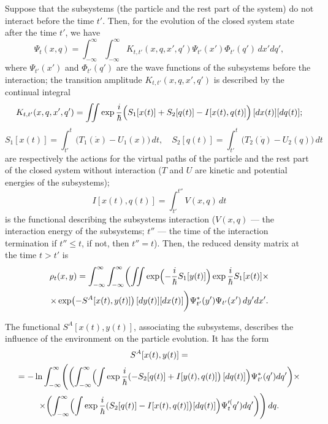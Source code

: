 Suppose that the subsystems (the particle and the rest part of the system) do not interact before the time $t'$. Then, for the evolution of the closed system state after the time $t'$, we have
\begin{equation*}
 \Psi_{t}(x,q)=\int _{-\infty}^{\infty}\int _{-\infty}^{\infty} K_{t,t'}(x,q,x',q')\Psi_{t'}(x')\Phi_{t'}(q')\,dx'dq',
\end{equation*}
where $\Psi_{t'}(x')$ and $\Phi_{t'}(q')$ are the wave functions of the subsystems before the interaction; 
the transition amplitude $K_{t,t'}(x,q,x',q')$ is described by the continual integral~\cite{bib:12}
\begin{equation*}
 K_{t,t'}(x,q,x',q')=\iint \exp\frac{i}{\hbar}\Bigl(S_1[x(t)]+S_2[q(t)]-I[x(t),q(t)]\Bigr)\,[dx(t)][dq(t)]; 
\end{equation*}
$$S_1[x(t)]=\int _{t'}^{t}\bigl(T_1(\dot{x})-U_1(x)\bigr)\,dt,\quad S_2[q(t)]=\int _{t'}^{t}\bigl(T_2(\dot{q})-U_2(q)\bigr)\,dt$$ are respectively the actions for the virtual paths of the particle and the rest part of the closed system without interaction ($T$ and $U$ are kinetic and potential energies of the subsystems); 
$$
I[x(t),q(t)]=\int _{t'}^{t''}V(x,q)\,dt
$$ is the functional describing the subsystems interaction ($V(x,q)$ --- the interaction energy of the subsystems; $t''$  --- the time of the interaction termination if $t''\leq t$, if not, then $t''=t$). Then, the reduced density matrix at the time $t>t'$ is 
\begin{multline}\label{eq:math:ex1}
 \rho_t(x,y)=\int _{-\infty}^{\infty}\int _{-\infty}^{\infty}\biggl(\iint\exp\Bigl(-\frac{i}{\hbar}S_1[y(t)]\Bigr)\exp\frac{i}{\hbar}S_1[x(t)]\times 
 \\
 \times\exp\bigl(- S^A[x(t),y(t)]\bigr)\,[dy(t)][dx(t)]\biggr)\Psi_{t'}^*(y')\Psi_{t'}(x')\,dy'dx'.
\end{multline}

The functional $S^A[x(t),y(t)]$, associating the subsystems, describes the influence of the environment on the particle evolution. It has the form
\begin{multline}\label{eq:math:ex2}
 S^A[x(t),y(t)]=\\
 =-\ln\int _{-\infty}^{\infty}\Biggl(\biggl(\int _{-\infty}^{\infty}\Bigl(\int\exp\frac{i}{\hbar}(-S_2[q(t)]+I[y(t),q(t)]\bigr)\,[dq(t)]\Bigr)\Psi_{t'}^*(q')dq'\biggr)\times
 \\
 \times\biggl(\int _{-\infty}^{\infty}\Bigl(\int\exp\frac{i}{\hbar}(S_2[q(t)]-I[x(t),q(t)]\bigr)[dq(t)]\Bigr)\Psi_{t}'^(q')dq'\biggr)\Biggr)\,dq.
\end{multline}

